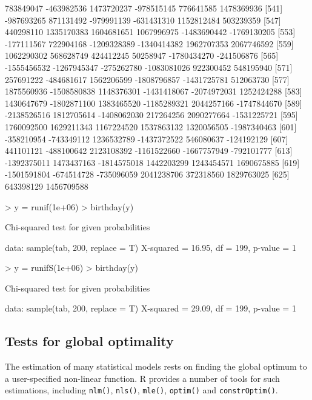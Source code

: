 \documentclass[11pt]{article}
\begin{document}
{\begin{Schunk}
\begin{Soutput}
[535]   783849047  -463982536  1473720237  -978515145   776641585  1478369936
[541]  -987693265   871131492  -979991139  -631431310  1152812484   503239359
[547]   440298110  1335170383  1604681651  1067996975 -1483690442 -1769130205
[553]  -177111567   722904168 -1209328389 -1340414382  1962707353  2067746592
[559]  1062290302   568628749   424412245    50258947 -1780434270  -241506876
[565] -1555456532 -1267945347  -275262780 -1083081026   922300452   548195940
[571]   257691222  -484681617  1562206599 -1808796857 -1431725781   512063730
[577]  1875560936 -1508580838  1148376301 -1431418067 -2074972031  1252424288
[583]  1430647679 -1802871100  1383465520 -1185289321  2044257166 -1747844670
[589] -2138526516  1812705614 -1408062030   217264256  2090277664 -1531225721
[595]  1760092500  1629211343  1167224520  1537863132  1320056505 -1987340463
[601]  -358210954  -743349112  1236532789 -1437372522   546080637  -124192129
[607]   441101121  -488100642  2123108392 -1161522660 -1667757949  -792101777
[613] -1392375011  1473437163 -1814575018  1442203299  1243454571  1690675885
[619] -1501591804  -674514728  -735096059  2041238706   372318560  1829763025
[625]   643398129  1456709588
\end{Soutput}
\begin{Sinput}
> y = runif(1e+06)
> birthday(y)
\end{Sinput}
\begin{Soutput}
	Chi-squared test for given probabilities

data:  sample(tab, 200, replace = T) 
X-squared = 16.95, df = 199, p-value = 1
\end{Soutput}
\begin{Sinput}
> y = runifS(1e+06)
> birthday(y)
\end{Sinput}
\begin{Soutput}
	Chi-squared test for given probabilities

data:  sample(tab, 200, replace = T) 
X-squared = 29.09, df = 199, p-value = 1
\end{Soutput}
\end{Schunk}
}
\subsection{Tests for global optimality}

The estimation of many statistical models rests on finding the global optimum
to a user-specified non-linear function. R provides a number of tools for such
estimations, including \texttt{nlm()}, \texttt{nls()}, \texttt{mle()}, 
\texttt{optim()}  and \texttt{constrOptim()}. 
\end{document}
